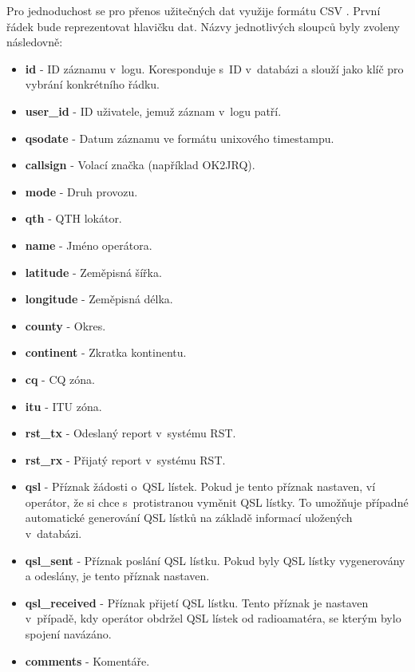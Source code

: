 Pro jednoduchost se pro přenos užitečných dat využije formátu CSV \cite{csv}. První řádek
bude reprezentovat hlavičku dat. Názvy jednotlivých
sloupců byly zvoleny následovně: %
\begin{itemize}
\item \textbf{id} - ID záznamu v~logu. Koresponduje s~ID v~databázi a slouží jako klíč pro vybrání konkrétního řádku.
\item \textbf{user\_id} - ID uživatele, jemuž záznam v~logu patří.
\item \textbf{qsodate} - Datum záznamu ve formátu unixového timestampu.
\item \textbf{callsign} - Volací značka (například OK2JRQ).
\item \textbf{mode} - Druh provozu. %
\item \textbf{qth} - QTH lokátor.
\item \textbf{name} - Jméno operátora.
\item \textbf{latitude} - Zeměpisná šířka.
\item \textbf{longitude} - Zeměpisná délka.
\item \textbf{county} - Okres.
\item \textbf{continent} - Zkratka kontinentu.
\item \textbf{cq} - CQ zóna.
\item \textbf{itu} - ITU zóna.
\item \textbf{rst\_tx} - Odeslaný report v~systému RST.
\item \textbf{rst\_rx} - Přijatý report v~systému RST.
\item \textbf{qsl} - Příznak žádosti o~QSL lístek. Pokud je tento příznak nastaven, ví operátor, že si chce
s~protistranou vyměnit QSL lístky. To umožňuje případné automatické generování QSL lístků na základě informací
uložených v~databázi.
\item \textbf{qsl\_sent} - Příznak poslání QSL lístku. Pokud byly QSL lístky vygenerovány a odeslány, je tento
příznak nastaven.
\item \textbf{qsl\_received} - Příznak přijetí QSL lístku. Tento příznak je nastaven v~případě, kdy operátor
obdržel QSL lístek od radioamatéra, se kterým bylo spojení navázáno.
\item \textbf{comments} - Komentáře.
\end{itemize}

